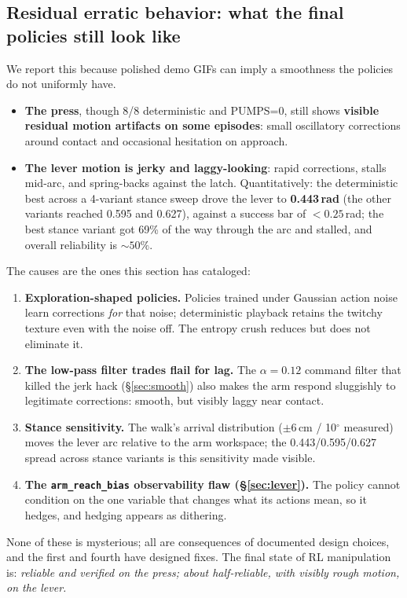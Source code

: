 \documentclass[11pt]{article}
\newcommand{\degs}{$^{\circ}$}
\begin{document}
\subsection{Residual erratic behavior: what the final policies still look like}
\label{sec:erratic}

We report this because polished demo GIFs can imply a smoothness the policies do not uniformly have.
\begin{itemize}[nosep]
  \item \textbf{The press}, though 8/8 deterministic and PUMPS=0, still shows \textbf{visible residual motion artifacts on some episodes}: small oscillatory corrections around contact and occasional hesitation on approach.
  \item \textbf{The lever motion is jerky and laggy-looking}: rapid corrections, stalls mid-arc, and spring-backs against the latch. Quantitatively: the deterministic best across a 4-variant stance sweep drove the lever to \textbf{0.443\,rad} (the other variants reached 0.595 and 0.627), against a success bar of $\mathbf{< 0.25}$\,rad; the best stance variant got 69\% of the way through the arc and stalled, and overall reliability is ${\sim}50\%$.
\end{itemize}

The causes are the ones this section has cataloged:
\begin{enumerate}[nosep]
  \item \textbf{Exploration-shaped policies.} Policies trained under Gaussian action noise learn corrections \emph{for} that noise; deterministic playback retains the twitchy texture even with the noise off. The entropy crush reduces but does not eliminate it.
  \item \textbf{The low-pass filter trades flail for lag.} The $\alpha = 0.12$ command filter that killed the jerk hack (\S\ref{sec:smooth}) also makes the arm respond sluggishly to legitimate corrections: smooth, but visibly laggy near contact.
  \item \textbf{Stance sensitivity.} The walk's arrival distribution ($\pm 6$\,cm / 10\degs{} measured) moves the lever arc relative to the arm workspace; the 0.443/0.595/0.627 spread across stance variants is this sensitivity made visible.
  \item \textbf{The \texttt{arm\_reach\_bias} observability flaw (\S\ref{sec:lever}).} The policy cannot condition on the one variable that changes what its actions mean, so it hedges, and hedging appears as dithering.
\end{enumerate}
None of these is mysterious; all are consequences of documented design choices, and the first and fourth have designed fixes. The final state of RL manipulation is: \emph{reliable and verified on the press; about half-reliable, with visibly rough motion, on the lever.}
\end{document}
